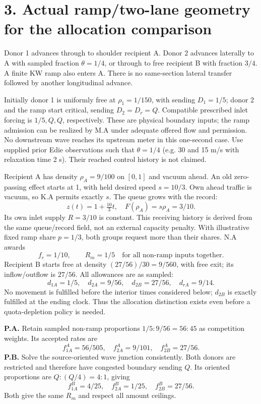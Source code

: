 \documentclass[11pt,a4paper]{article}
\begin{document}
\newpage
\section*{3. Actual ramp/two-lane geometry for the allocation comparison}
Donor 1 advances through to shoulder recipient A. Donor 2 advances laterally
to A with sampled fraction $\theta=1/4$, or through to free recipient B with
fraction $3/4$. A finite KW ramp also enters A. There is no same-section
lateral transfer followed by another longitudinal advance.

Initially donor 1 is uniformly free at $\rho_1=1/150$, with sending
$D_1=1/5$; donor 2 and the ramp start critical, sending $D_2=D_r=Q$.
Compatible prescribed inlet forcing is $1/5,Q,Q$, respectively. These are
physical boundary inputs; the ramp admission can be realized by M.A under
adequate offered flow and permission. No downstream wave reaches its upstream
meter in this one-second case. Use supplied prior Edie observations such
that $\theta=1/4$ (e.g. 30 and 15 m/s with relaxation time 2 s). Their reached
control history is not claimed.

Recipient A has density $\rho_A=9/100$ on $[0,1]$ and vacuum ahead. An old
zero-passing effect starts at 1, with held desired speed $s=10/3$. Own ahead
traffic is vacuum, so K.A permits exactly $s$. The queue grows with the record:
\begin{equation}
 z(t)=1+\tfrac{10}{3}t,\quad F(\rho_A)=s\rho_A=3/10.
\end{equation}
Its own inlet supply $R=3/10$ is constant. This receiving history is derived
from the same queue/record field, not an external capacity penalty.
With illustrative fixed ramp share $p=1/3$, both groups request more than
their shares. N.A awards
\begin{equation}
 f_r=1/10,\qquad R_m=1/5\quad\text{for all non-ramp inputs together}.
\end{equation}
Recipient B starts free at density $(27/56)/30=9/560$, with free exit; its
inflow/outflow is $27/56$. All allowances are as sampled:
\begin{equation}
 d_{1A}=1/5,\quad d_{2A}=9/56,\quad d_{2B}=27/56,\quad d_{rA}=9/14.
\end{equation}
No movement is fulfilled before the interior times considered below; $d_{2B}$
is exactly fulfilled at the ending clock. Thus the allocation distinction
exists even before a quota-depletion policy is needed.

\textbf{P.A.} Retain sampled non-ramp proportions $1/5:9/56=56:45$ as
competition weights. Its accepted rates are
\begin{equation}
 f_{1A}^{A}=56/505,\quad f_{2A}^{A}=9/101,\quad f_{2B}^{A}=27/56.
\end{equation}
\textbf{P.B.} Solve the source-oriented wave junction consistently. Both
donors are restricted and therefore have congested boundary sending $Q$.
Its oriented proportions are $Q:(Q/4)=4:1$, giving
\begin{equation}
 f_{1A}^{B}=4/25,\quad f_{2A}^{B}=1/25,\quad f_{2B}^{B}=27/56.
\end{equation}
Both give the same $R_m$ and respect all amount ceilings.
\end{document}

